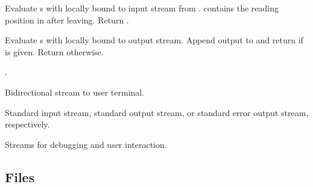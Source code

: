 \begin{LIST}{1cm}
  {
  Evaluate s with  locally bound to input stream
  from .  contains the reading position in
   after leaving. Return . 
  }

  {
  Evaluate s with  locally bound to output
  stream. Append output to  and return  if  is given. Return  otherwise. 
  }

  {
  .
  }

  {
  Bidirectional stream to user terminal.
  }

  {
  Standard input stream, standard output stream, 
  or standard error output stream, respectively.
  }

  {
  Streams for debugging and user interaction.
  }

\end{LIST}


\subsection{Files} 

